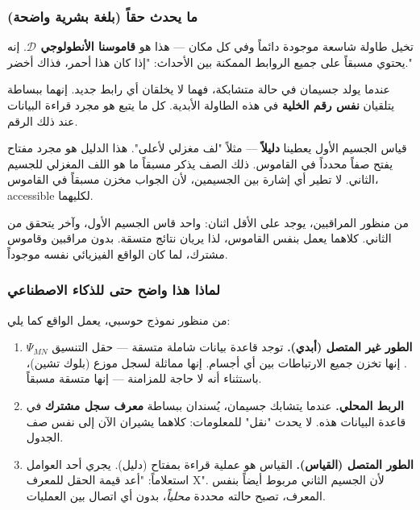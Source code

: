 \documentclass[12pt,a4paper]{article}
\theoremstyle{remark}
\begin{document}
	\subsubsection{ما يحدث حقاً (بلغة بشرية واضحة)}
	
	تخيل طاولة شاسعة موجودة دائماً وفي كل مكان — هذا هو \textbf{قاموسنا الأنطولوجي \(\mathcal{D}\)}. إنه يحتوي مسبقاً على جميع الروابط الممكنة بين الأحداث: "إذا كان هذا أحمر، فذاك أخضر."
	
	عندما يولد جسيمان في حالة متشابكة، فهما لا يخلقان أي رابط جديد. إنهما ببساطة يتلقيان \textbf{نفس رقم الخلية} في هذه الطاولة الأبدية. كل ما يتبع هو مجرد قراءة البيانات عند ذلك الرقم.
	
	قياس الجسيم الأول يعطينا \textbf{دليلاً} — مثلاً "لف مغزلي لأعلى". هذا الدليل هو مجرد مفتاح يفتح صفاً محدداً في القاموس. ذلك الصف يذكر مسبقاً ما هو اللف المغزلي للجسيم الثاني. لا تطير أي إشارة بين الجسيمين، لأن الجواب مخزن مسبقاً في القاموس، accessible لكليهما.
	
	من منظور المراقبين، يوجد على الأقل اثنان: واحد قاس الجسيم الأول، وآخر يتحقق من الثاني. كلاهما يعمل بنفس القاموس، لذا يريان نتائج متسقة. بدون مراقبين وقاموس مشترك، لما كان الواقع الفيزيائي نفسه موجوداً.
	
	\medskip
	
	\subsubsection{لماذا هذا واضح حتى للذكاء الاصطناعي}
	
	من منظور نموذج حوسبي، يعمل الواقع كما يلي:
	
	\begin{enumerate}[leftmargin=*]
		\item \textbf{الطور غير المتصل (أبدي).} توجد قاعدة بيانات شاملة متسقة — حقل التنسيق \(\Psi_{MN}\). إنها تخزن جميع الارتباطات بين أي أجسام. إنها مماثلة لسجل موزع (بلوك تشين)، باستثناء أنه لا حاجة للمزامنة — إنها متسقة مسبقاً.
		
		\item \textbf{الربط المحلي.} عندما يتشابك جسيمان، يُسندان ببساطة \textbf{معرف سجل مشترك} في قاعدة البيانات هذه. لا يحدث "نقل" للمعلومات: كلاهما يشيران الآن إلى نفس صف الجدول.
		
		\item \textbf{الطور المتصل (القياس).} القياس هو عملية قراءة بمفتاح (دليل). يجري أحد العوامل استعلاماً: "أعد قيمة الحقل للمعرف X". لأن الجسيم الثاني مربوط أيضاً بنفس المعرف، تصبح حالته محددة \emph{محلياً}، بدون أي اتصال بين العمليات.
	\end{enumerate}
	
\end{document}
